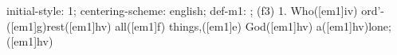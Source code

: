 initial-style: 1;
centering-scheme: english;
def-m1: \grealign;
(f3) 1. Who([em1]iv) ord'-([em1]g)rest([em1]hv) all([em1]f) things,([em1]e) God([em1]hv) a([em1]hv)lone;([em1]hv)